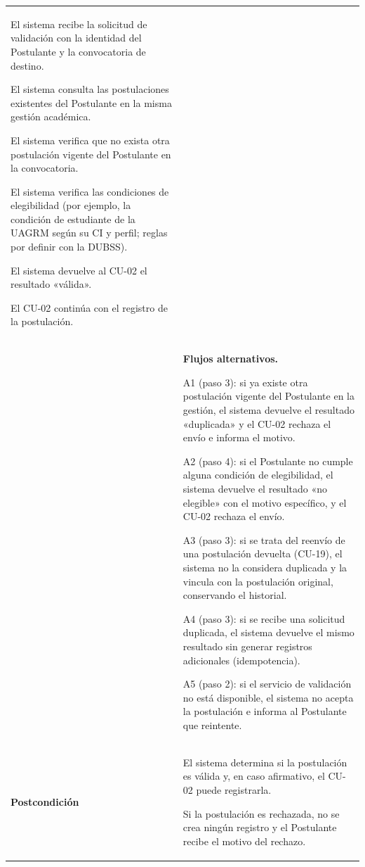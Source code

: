 \begin{longtable}{>{\raggedright\arraybackslash}p{2.9cm} >{\raggedright\arraybackslash}p{12.6cm}}
\begin{cupasos}
    \item El sistema recibe la solicitud de validación con la identidad del Postulante y la convocatoria de destino.
    \item El sistema consulta las postulaciones existentes del Postulante en la misma gestión académica.
    \item El sistema verifica que no exista otra postulación vigente del Postulante en la convocatoria.
    \item El sistema verifica las condiciones de elegibilidad (por ejemplo, la condición de estudiante de la UAGRM según su CI y perfil; reglas por definir con la DUBSS).
    \item El sistema devuelve al CU-02 el resultado «válida».
    \item El CU-02 continúa con el registro de la postulación.
\end{cupasos} \\
 & \textbf{Flujos alternativos.}
\begin{cuvin}
    \item A1 (paso 3): si ya existe otra postulación vigente del Postulante en la gestión, el sistema devuelve el resultado «duplicada» y el CU-02 rechaza el envío e informa el motivo.
    \item A2 (paso 4): si el Postulante no cumple alguna condición de elegibilidad, el sistema devuelve el resultado «no elegible» con el motivo específico, y el CU-02 rechaza el envío.
    \item A3 (paso 3): si se trata del reenvío de una postulación devuelta (CU-19), el sistema no la considera duplicada y la vincula con la postulación original, conservando el historial.
    \item A4 (paso 3): si se recibe una solicitud duplicada, el sistema devuelve el mismo resultado sin generar registros adicionales (idempotencia).
    \item A5 (paso 2): si el servicio de validación no está disponible, el sistema no acepta la postulación e informa al Postulante que reintente.
\end{cuvin} \\
\midrule
\textbf{Postcondición} & \vspace{-\baselineskip}\begin{cuvin}
    \item El sistema determina si la postulación es válida y, en caso afirmativo, el CU-02 puede registrarla.
    \item Si la postulación es rechazada, no se crea ningún registro y el Postulante recibe el motivo del rechazo.

\end{cuvin}
\end{longtable}
